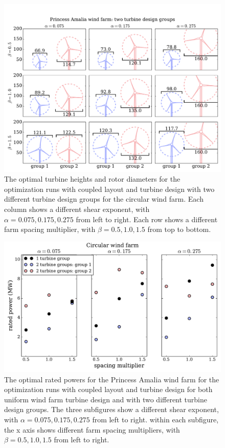 \begin{figure}[htbp]
  \centering
  \includegraphics[trim={0.5cm 0.3cm 0.3cm 1.75cm},clip,width=\textwidth]{Figures/turbineSizesAmalia_2.pdf}
  \caption{\label{amalia_turbines} The optimal turbine heights and rotor diameters for the optimization runs with coupled layout and turbine design with two different turbine design groups for the circular wind farm. Each column shows a different shear exponent, with $\alpha=0.075,0.175,0.275$ from left to right. Each row shows a different farm spacing multiplier, with $\beta=0.5,1.0,1.5$ from top to bottom.}
\end{figure}


\begin{figure}[htbp]
  \centering
  \includegraphics[width=\textwidth]{Figures/amaliaPowers.pdf}
  \caption{\label{amalia_power} The optimal rated powers for the Princess Amalia wind farm for the optimization runs with coupled layout and turbine design for both uniform wind farm turbine design and with two different turbine design groups. The three subfigures show a different shear exponent, with $\alpha=0.075,0.175,0.275$ from left to right. within each subfigure, the x axis shows different farm spacing multipliers, with $\beta=0.5,1.0,1.5$ from left to right.}
\end{figure}




